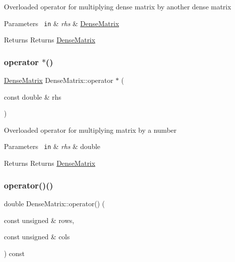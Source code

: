 Overloaded operator for multiplying dense matrix by another dense matrix 
\begin{DoxyParams}[1]{Parameters}
\mbox{\texttt{ in}}  & {\em rhs} & \mbox{\hyperlink{class_dense_matrix}{Dense\+Matrix}} \\
\hline
\end{DoxyParams}
\begin{DoxyReturn}{Returns}
Returns \mbox{\hyperlink{class_dense_matrix}{Dense\+Matrix}} 
\end{DoxyReturn}
\mbox{\label{class_dense_matrix_afe8866f292ef3e14928425cfe5b1f905}} 
\subsubsection{\texorpdfstring{operator $\ast$()}{operator *()}\hspace{0.1cm}{\footnotesize\ttfamily [2/2]}}
{\footnotesize\ttfamily \mbox{\hyperlink{class_dense_matrix}{Dense\+Matrix}} Dense\+Matrix\+::operator $\ast$ (\begin{DoxyParamCaption}\item[{const double \&}]{rhs }\end{DoxyParamCaption})}

Overloaded operator for multiplying matrix by a number 
\begin{DoxyParams}[1]{Parameters}
\mbox{\texttt{ in}}  & {\em rhs} & double \\
\hline
\end{DoxyParams}
\begin{DoxyReturn}{Returns}
Returns \mbox{\hyperlink{class_dense_matrix}{Dense\+Matrix}} 
\end{DoxyReturn}
\mbox{\label{class_dense_matrix_a1a1d7059dbf920083526b4e17b0c1d66}} 
\subsubsection{\texorpdfstring{operator()()}{operator()()}}
{\footnotesize\ttfamily double Dense\+Matrix\+::operator() (\begin{DoxyParamCaption}\item[{const unsigned \&}]{rows,  }\item[{const unsigned \&}]{cols }\end{DoxyParamCaption}) const}

